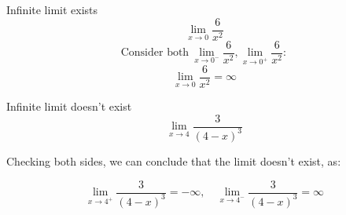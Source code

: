 \begin{minipage}{0.45\textwidth}
    \begin{example}
        Infinite limit exists
        \[\lim_{x\to 0}\frac{6}{x^2}\]
        \[\text{Consider both}\ \lim_{x\to 0^-}\frac{6}{x^2},\lim_{x\to 0^+}\frac{6}{x^2}:\]
        \[\lim_{x\to 0}\frac{6}{x^2}=\infty\]
    \end{example}
\end{minipage}
\hfill
\begin{minipage}{0.45\textwidth}
    \vspace{10pt}
    \begin{example}
        Infinite limit doesn't exist
        \[\lim_{x\to 4}\frac{3}{(4-x)^3}\]
        \begin{center}
            Checking both sides, we can conclude that the limit doesn't exist, as:
        \end{center}
        \[\lim_{x\to 4^+}\frac{3}{(4-x)^3}=-\infty,\quad\lim_{x\to 4^-}\frac{3}{(4-x)^3}=\infty\]
    \end{example}
\end{minipage}

